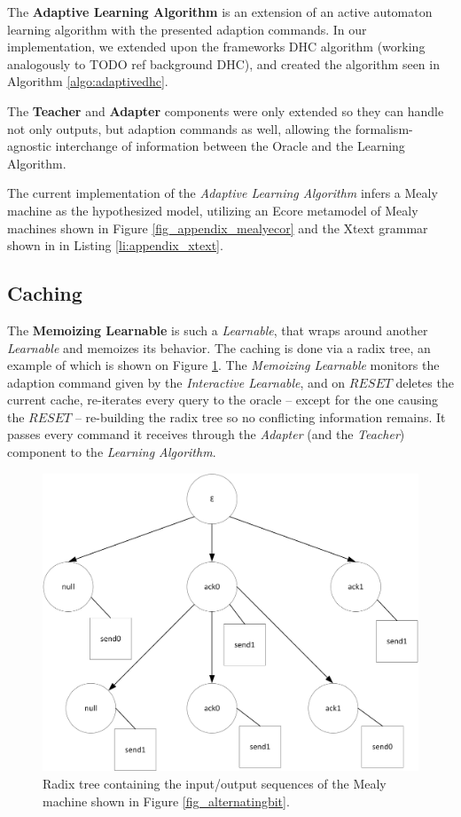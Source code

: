 The \textbf{Adaptive Learning Algorithm} is an extension of an active automaton learning algorithm with the presented adaption commands. In our implementation, we extended upon the frameworks DHC algorithm (working analogously to TODO ref background DHC), and created the algorithm seen in Algorithm \ref{algo:adaptivedhc}.

The \textbf{Teacher} and \textbf{Adapter} components were only extended so they can handle not only outputs, but adaption commands as well, allowing the formalism-agnostic interchange of information between the Oracle and the Learning Algorithm.

The current implementation of the \textit{Adaptive Learning Algorithm} infers a Mealy machine as the hypothesized model, utilizing an Ecore metamodel of Mealy machines shown in Figure \ref{fig_appendix_mealyecor} and the Xtext grammar shown in in Listing \ref{li:appendix_xtext}.



\subsection{Caching} \label{subsec_memoization}

The \textbf{Memoizing Learnable} is such a \textit{Learnable}, that wraps around another \textit{Learnable} and memoizes its behavior. The caching is done via a radix tree, an example of which is shown on Figure \ref{fig_impl_radix_example}. The \textit{Memoizing Learnable} monitors the adaption command given by the \textit{Interactive Learnable}, and on $RESET$ deletes the current cache, re-iterates every query to the oracle -- except for the one causing the $RESET$ -- re-building the radix tree so no conflicting information remains. It passes every command it receives through the \textit{Adapter} (and the \textit{Teacher}) component to the \textit{Learning Algorithm}.

\begin{figure}[!ht] 
	\centering
	\includegraphics[width=120mm, keepaspectratio]{figures/impl_radix_example.png}
	\caption{Radix tree containing the input/output sequences of the Mealy machine shown in Figure \ref{fig_alternatingbit}.} 
	\label{fig_impl_radix_example}
\end{figure}
